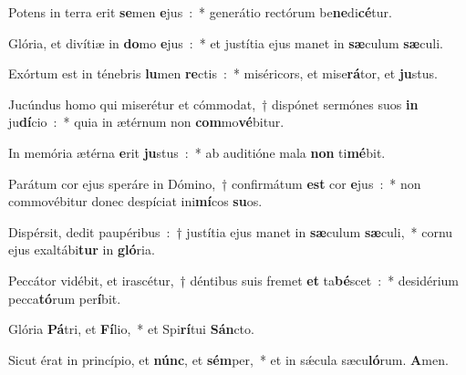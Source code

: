 ﻿\item Potens in terra erit \textbf{se}\-men \textbf{e}jus~:~* generátio rectórum be\textbf{ne}di\textbf{cé}tur.
\item Glória, et divítiæ in \textbf{do}\-mo \textbf{e}jus~:~* et justítia ejus manet in \textbf{sæ}\-culum \textbf{sæ}culi.
\item Exórtum est in ténebris \textbf{lu}\-men \textbf{re}\-ctis~:~* miséricors, et mise\textbf{rá}\-tor, et \textbf{ju}stus.
\item Jucúndus homo qui miserétur et cómmodat,~† dispónet sermónes suos \textbf{in} ju\textbf{dí}\-cio~:~* quia in ætérnum non \textbf{com}mo\textbf{vé}bitur.
\item In memória ætérna \textbf{e}\-rit \textbf{ju}\-stus~:~* ab auditióne mala \textbf{non} ti\textbf{mé}bit.
\item Parátum cor ejus speráre in Dómino,~† confirmátum \textbf{est} cor \textbf{e}jus~:~* non commovébitur donec despíciat ini\textbf{mí}\-cos \textbf{su}os.
\item Dispérsit, dedit pau\-pé\-ri\-bus~:~† justítia ejus manet in \textbf{sæ}\-culum \textbf{sæ}\-culi,~* cornu ejus exaltábi\textbf{tur} in \textbf{gló}ria.
\item Peccátor vidébit, et irascétur,~† déntibus suis fremet \textbf{et} ta\textbf{bé}\-scet~:~* desidérium pecca\textbf{tó}\-rum per\textbf{í}bit.
\item Glória \textbf{Pá}\-tri, et \textbf{Fí}\-lio,~* et Spi\textbf{rí}\-tui \textbf{Sán}cto.
\item Sicut érat in princípio, et \textbf{núnc}, et \textbf{sém}\-per,~* et in sǽcula sæcu\textbf{ló}\-rum. \textbf{A}men.
